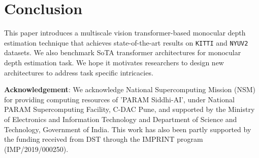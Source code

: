 \documentclass{article}
\newcommand{\myfirstpara}[1]{\noindent \textbf{#1}:}
\newcommand{\mypara}[1]{\vspace{0.5em} \myfirstpara{#1}}
\newcommand{\KITTI}{\texttt{KITTI}\xspace}
\newcommand{\NYU}{\texttt{NYUV2}\xspace}
\begin{document}
\section{Conclusion}
\label{sec:conclusion}

This paper introduces a multiscale vision transformer-based monocular depth estimation technique that achieves state-of-the-art results on \KITTI and \NYU datasets. We also benchmark SoTA transformer architectures for monocular depth estimation task. We hope it motivates researchers to design new architectures to address task specific intricacies.

\mypara{Acknowledgement} We acknowledge National Supercomputing Mission (NSM) for providing computing resources of 'PARAM Siddhi-AI', under National PARAM Supercomputing Facility, C-DAC Pune, and supported by the Ministry of Electronics and Information Technology and Department of Science and Technology, Government of India. This work has also been partly supported by the funding received from DST through the IMPRINT program (IMP/2019/000250). 







\end{document}
